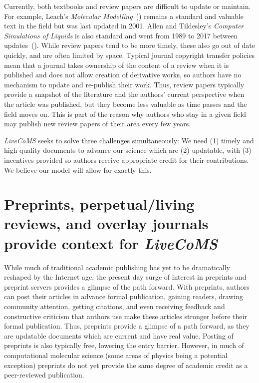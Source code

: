 \documentclass[9pt]{livecoms}
\begin{document}
Currently, both textbooks and review papers are difficult to update or maintain.
For example, Leach's \emph{Molecular Modelling}~(\cite{Leach:2001:}) remains a standard and valuable text in the field but was last updated in 2001.
Allen and Tildesley's \emph{Computer Simulations of Liquids} is also standard and went from 1989 to 2017 between updates~(\cite{allen_computer_2017}). 
While review papers tend to be more timely, these also go out of date quickly, and are often limited by space. 
Typical journal copyright transfer policies mean that a journal takes ownership of the content of a review when it is published and does not allow creation of derivative works, so authors have no mechanism to update and re-publish their work.
Thus, review papers typically provide a snapshot of the literature and the authors' current perspective when the article was published, but they become less valuable as time passes and the field moves on.
This is part of the reason why authors who stay in a given field may publish new review papers of their area every few years. 

\emph{LiveCoMS} seeks to solve three challenges simultaneously: We need (1) timely and high quality documents to advance our science which are (2) updatable, with (3) incentives provided so authors receive appropriate credit for their contributions.
We believe our model will allow for exactly this. 

\section{Preprints, perpetual/living reviews, and overlay journals provide context for \emph{LiveCoMS}}

While much of traditional academic publishing has yet to be dramatically reshaped by the Internet age, the present day surge of interest in preprints and preprint servers provides a glimpse of the path forward.
With preprints, authors can post their articles in advance formal publication, gaining readers, drawing community attention, getting citations, and even receiving feedback and constructive criticism that authors use make these articles stronger before their formal publication.
Thus, preprints provide a glimpse of a path forward, as they are updatable documents which are current and have real value.
Posting of preprints is also typically free, lowering the entry barrier. 
However, in much of computational molecular science (some areas of physics being a potential exception) preprints do not yet provide the same degree of academic credit as a peer-reviewed publication. 
\end{document}
